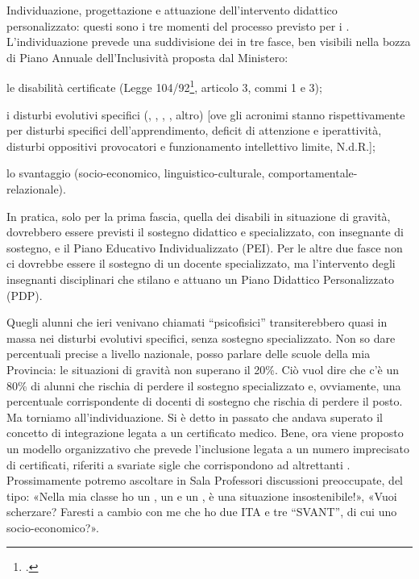 Individuazione, progettazione e attuazione dell'intervento didattico personalizzato: questi sono i tre momenti del processo previsto per i . L'individuazione prevede una suddivisione dei  in tre fasce, ben visibili nella bozza di Piano Annuale dell'Inclusività proposta dal Ministero:
\begin{description}
	\item[$-$] le disabilità certificate (Legge 104/92\footcite{Legge_104_92}, articolo 3, commi 1 e 3);
	\item i disturbi evolutivi specifici (, , , , altro) [ove gli acronimi stanno rispettivamente per disturbi specifici dell'apprendimento, deficit di attenzione e iperattività, disturbi oppositivi provocatori e funzionamento intellettivo limite, N.d.R.];
	\item lo svantaggio (socio-economico, linguistico-culturale, comportamentale-relazionale).
\end{description}

In pratica, solo per la prima fascia, quella dei disabili in situazione di gravità, dovrebbero essere previsti il sostegno didattico e specializzato, con insegnante di sostegno, e il Piano Educativo Individualizzato (PEI). Per le altre due fasce non ci dovrebbe essere il sostegno di un docente specializzato, ma l'intervento degli insegnanti disciplinari che stilano e attuano un Piano Didattico Personalizzato (PDP).

Quegli alunni che ieri venivano chiamati “psicofisici” transiterebbero quasi in massa nei disturbi evolutivi specifici, senza sostegno specializzato. Non so dare percentuali precise a livello nazionale, posso parlare delle scuole della mia Provincia: le situazioni di gravità non superano il 20\%. Ciò vuol dire che c'è un 80\% di alunni che rischia di perdere il sostegno specializzato e, ovviamente, una percentuale corrispondente di docenti di sostegno che rischia di perdere il posto.
Ma torniamo all'individuazione. Si è detto in passato che andava superato il concetto di integrazione legata a un certificato medico. Bene, ora viene proposto un modello organizzativo che prevede l'inclusione legata a un numero imprecisato di certificati, riferiti a svariate sigle che corrispondono ad altrettanti . Prossimamente potremo ascoltare in Sala Professori discussioni preoccupate, del tipo: «Nella mia classe ho un , un  e un , è una situazione insostenibile!», «Vuoi scherzare? Faresti a cambio con me che ho due ITA  e tre “SVANT”, di cui uno socio-economico?».

